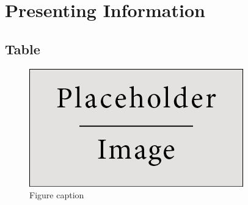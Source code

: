 


\chapter{Presenting Information}

\section{Table}

\begin{figure}[h]
\centering\includegraphics[scale=0.5]{chapters/cap-exemplos/placeholder}
\caption{Figure caption}
\end{figure}
